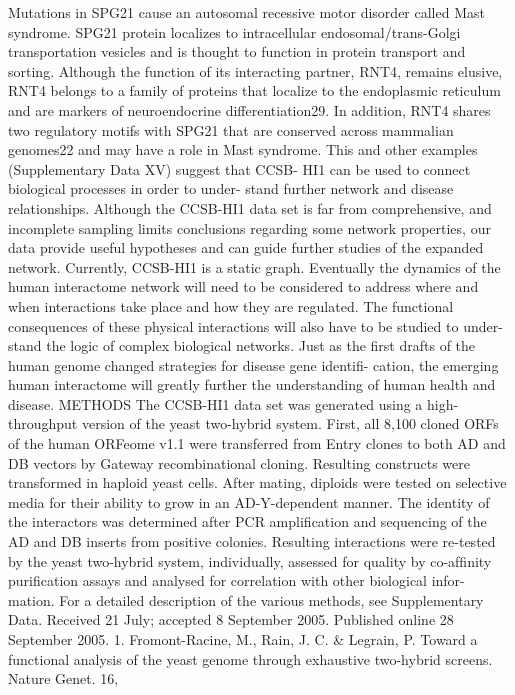 Mutations in SPG21 cause an autosomal recessive motor disorder
called Mast syndrome. SPG21 protein localizes to intracellular
endosomal/trans-Golgi transportation vesicles and is thought to
function in protein transport and sorting. Although the function
of its interacting partner, RNT4, remains elusive, RNT4 belongs to a
family of proteins that localize to the endoplasmic reticulum and are
markers of neuroendocrine differentiation29. In addition, RNT4
shares two regulatory motifs with SPG21 that are conserved across
mammalian genomes22 and may have a role in Mast syndrome. This
and other examples (Supplementary Data XV) suggest that CCSB-
HI1 can be used to connect biological processes in order to under-
stand further network and disease relationships.
Although the CCSB-HI1 data set is far from comprehensive, and
incomplete sampling limits conclusions regarding some network
properties, our data provide useful hypotheses and can guide further
studies of the expanded network. Currently, CCSB-HI1 is a static
graph. Eventually the dynamics of the human interactome network
will need to be considered to address where and when interactions
take place and how they are regulated. The functional consequences
of these physical interactions will also have to be studied to under-
stand the logic of complex biological networks. Just as the ﬁrst drafts
of the human genome changed strategies for disease gene identiﬁ-
cation, the emerging human interactome will greatly further the
understanding of human health and disease.
METHODS
The CCSB-HI1 data set was generated using a high-throughput version of the
yeast two-hybrid system. First, all 8,100 cloned ORFs of the human ORFeome
v1.1 were transferred from Entry clones to both AD and DB vectors by
Gateway recombinational cloning. Resulting constructs were transformed in
haploid yeast cells. After mating, diploids were tested on selective media for
their ability to grow in an AD-Y-dependent manner. The identity of the
interactors was determined after PCR ampliﬁcation and sequencing of the AD
and DB inserts from positive colonies. Resulting interactions were re-tested by
the yeast two-hybrid system, individually, assessed for quality by co-afﬁnity
puriﬁcation assays and analysed for correlation with other biological infor-
mation. For a detailed description of the various methods, see Supplementary
Data.
Received 21 July; accepted 8 September 2005.
Published online 28 September 2005.
1.
Fromont-Racine, M., Rain, J. C. \& Legrain, P. Toward a functional analysis of
the yeast genome through exhaustive two-hybrid screens. Nature Genet. 16,
